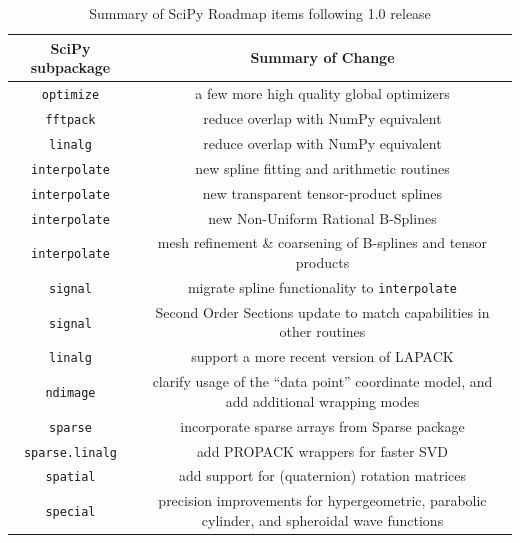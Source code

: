 \documentclass[fleqn,10pt]{wlscirep}
\begin{document}
\begin{table}[H]
\caption{Summary of SciPy Roadmap items following 1.0 release}
\begin{tabular}{ c|c }
    SciPy subpackage & Summary of Change \\
    \hline
    \texttt{optimize} & a few more high quality global optimizers\\
    \texttt{fftpack} & reduce overlap with NumPy equivalent \\
    \texttt{linalg} & reduce overlap with NumPy equivalent \\
    \texttt{interpolate} & new spline fitting and arithmetic routines \\
    \texttt{interpolate} & new transparent tensor-product splines\\
    \texttt{interpolate} & new Non-Uniform Rational B-Splines\\
    \texttt{interpolate} & mesh refinement \& coarsening of B-splines and tensor products\\
    \texttt{signal} & migrate spline functionality to \texttt{interpolate}\\
    \texttt{signal} & Second Order Sections update to match capabilities in other routines\\
    \texttt{linalg} & support a more recent version of LAPACK\\
    \texttt{ndimage} & clarify usage of the ``data point'' coordinate
    model, and add additional wrapping modes\\
    \texttt{sparse} & incorporate sparse arrays from Sparse package\cite{abbasi2018sparse} \\
    \texttt{sparse.linalg} & add PROPACK wrappers for faster SVD\\
    \texttt{spatial} & add support for (quaternion) rotation matrices\\
    \texttt{special} & precision improvements for hypergeometric, parabolic cylinder, and spheroidal wave functions\\
\end{tabular}\label{table:roadmap}
\end{table}
\end{document}
